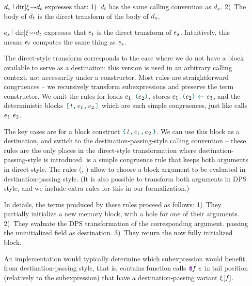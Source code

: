 $\datalangDef_s \tmcDir{\datalangRenaming} \datalangDef_t$ expresses that:
1)~$\datalangDef_t$ has the same calling convention as $\datalangDef_s$.
2)~The body of $\datalangDef_t$ is the direct transform of the body of $\datalangDef_s$.

$\datalangExpr_s \tmcDir{\datalangRenaming} \datalangDef_t$ expresses that $\datalangExpr_t$ is the direct transform of $\datalangExpr_s$.
Intuitively, this means $\datalangExpr_t$ computes the same thing as $\datalangExpr_s$.

The direct-style transform corresponds to the case where we do not have a block available to serve as a destination: this version is used in an arbitrary calling context, not necessarily under a constructor. Most rules are straightforward congruences -- we recursively transform subexpressions and preserve the term constructor. We omit the rules for loads $\datalangLoad{\datalangExpr_1}{\datalangExpr_2}$, stores $\datalangStore{\datalangExpr_1}{\datalangExpr_2}{\datalangExpr_3}$, and the deterministic blocks $\datalangBlockDet \datalangTag {\datalangExpr_1} {\datalangExpr_2}$ which are such simple congruences, just like calls $\datalangCall {\datalangExpr_1} {\datalangExpr_2}$.

The key cases are for a block construct $\datalangBlock \datalangTag {\datalangExpr_1} {\datalangExpr_2}$. We can use this block as a destination, and switch to the destination-passing-style calling convention -- these rules are the only places in the direct-style transformation where destination-passing-style is introduced.  is a simple congruence rule that keeps both arguments in direct style. The rules (, ) allow to choose a block argument to be evaluated in destination-passing style. (It is also possible to transform both arguments in DPS style, and we include extra rules for this in our formalization.)

In details, the terms produced by these rules proceed as follows:
1)~They partially initialize a new memory block, with a hole for one of their arguments.
2)~They evaluate the DPS transformation of the corresponding argument.
   passing the uninitialized field as destination.
3)~They return the now fully initialized block.

An implementation would typically determine which subexpression would benefit from destination-passing style, that is, contains function calls $\datalangCall {\datalangFnptr \datalangFn} \datalangExpr$ in tail position (relatively to the subexpression) that have a destination-passing variant $\datalangRenaming [\datalangFn]$.

